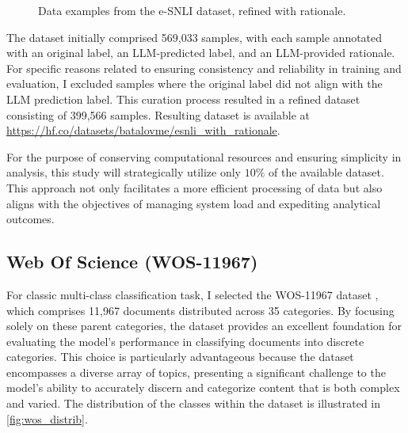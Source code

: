 \begin{figure}[hbt]
    \centering
    \begin{subfigure}[t]{.5\linewidth}
        \centering
        
    \end{subfigure}%
    \begin{subfigure}[t]{.5\linewidth}
        \centering
        
    \end{subfigure}

    \caption{Data examples from the e-SNLI dataset, refined with rationale.}
    \label{fig:rationale_dataset}
\end{figure}

The dataset initially comprised 569,033 samples, with each sample annotated with an original label, an LLM-predicted label, and an LLM-provided rationale. For specific reasons related to ensuring consistency and reliability in training and evaluation, I excluded samples where the original label did not align with the LLM prediction label. This curation process resulted in a refined dataset consisting of 399,566 samples. Resulting dataset is available at \linebreak \url{https://hf.co/datasets/batalovme/esnli_with_rationale}.

For the purpose of conserving computational resources and ensuring simplicity in analysis, this study will strategically utilize only $10\%$ of the available dataset. This approach not only facilitates a more efficient processing of data but also aligns with the objectives of managing system load and expediting analytical outcomes.

\subsection{Web Of Science (WOS-11967)}
\label{sec:wos}

For classic multi-class classification task, I selected the WOS-11967 dataset \cite{wos}, which comprises 11,967 documents distributed across 35 categories. By focusing solely on these parent categories, the dataset provides an excellent foundation for evaluating the model’s performance in classifying documents into discrete categories. This choice is particularly advantageous because the dataset encompasses a diverse array of topics, presenting a significant challenge to the model's ability to accurately discern and categorize content that is both complex and varied. The distribution of the classes within the dataset is illustrated in \autoref{fig:wos_distrib}.

